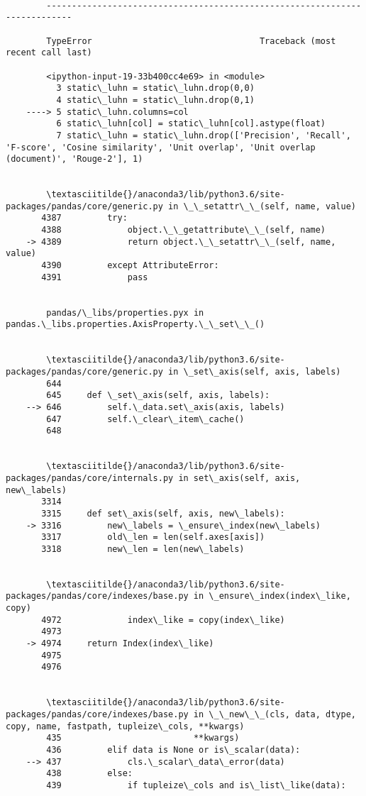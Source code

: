 \documentclass[11pt]{article}
\begin{document}
    \begin{Verbatim}[commandchars=\\\{\}]

        ---------------------------------------------------------------------------

        TypeError                                 Traceback (most recent call last)

        <ipython-input-19-33b400cc4e69> in <module>
          3 static\_luhn = static\_luhn.drop(0,0)
          4 static\_luhn = static\_luhn.drop(0,1)
    ----> 5 static\_luhn.columns=col
          6 static\_luhn[col] = static\_luhn[col].astype(float)
          7 static\_luhn = static\_luhn.drop(['Precision', 'Recall', 'F-score', 'Cosine similarity', 'Unit overlap', 'Unit overlap (document)', 'Rouge-2'], 1)


        \textasciitilde{}/anaconda3/lib/python3.6/site-packages/pandas/core/generic.py in \_\_setattr\_\_(self, name, value)
       4387         try:
       4388             object.\_\_getattribute\_\_(self, name)
    -> 4389             return object.\_\_setattr\_\_(self, name, value)
       4390         except AttributeError:
       4391             pass


        pandas/\_libs/properties.pyx in pandas.\_libs.properties.AxisProperty.\_\_set\_\_()


        \textasciitilde{}/anaconda3/lib/python3.6/site-packages/pandas/core/generic.py in \_set\_axis(self, axis, labels)
        644 
        645     def \_set\_axis(self, axis, labels):
    --> 646         self.\_data.set\_axis(axis, labels)
        647         self.\_clear\_item\_cache()
        648 


        \textasciitilde{}/anaconda3/lib/python3.6/site-packages/pandas/core/internals.py in set\_axis(self, axis, new\_labels)
       3314 
       3315     def set\_axis(self, axis, new\_labels):
    -> 3316         new\_labels = \_ensure\_index(new\_labels)
       3317         old\_len = len(self.axes[axis])
       3318         new\_len = len(new\_labels)


        \textasciitilde{}/anaconda3/lib/python3.6/site-packages/pandas/core/indexes/base.py in \_ensure\_index(index\_like, copy)
       4972             index\_like = copy(index\_like)
       4973 
    -> 4974     return Index(index\_like)
       4975 
       4976 


        \textasciitilde{}/anaconda3/lib/python3.6/site-packages/pandas/core/indexes/base.py in \_\_new\_\_(cls, data, dtype, copy, name, fastpath, tupleize\_cols, **kwargs)
        435                          **kwargs)
        436         elif data is None or is\_scalar(data):
    --> 437             cls.\_scalar\_data\_error(data)
        438         else:
        439             if tupleize\_cols and is\_list\_like(data):



\end{Verbatim}
\end{document}
